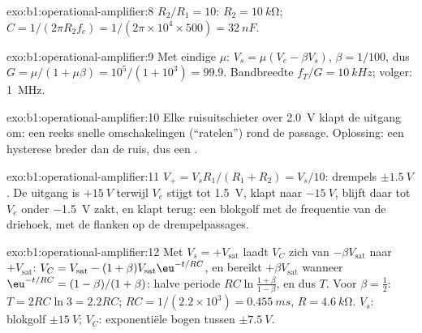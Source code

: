 \begin{solution}{exo:b1:operational-amplifier:8}
$R_2/R_1 = 10$: $R_2 = \qty{10}{k\ohm}$; $C = 1/(2\pi R_2f_c) = 1/(2\pi
\times 10^4 \times 500) = \qty{32}{nF}$.
\end{solution}

\begin{solution}{exo:b1:operational-amplifier:9}
Met eindige $\mu$: $V_s = \mu(V_e - \beta V_s)$, $\beta = 1/100$, dus
$G = \mu/(1 + \mu\beta) = 10^5/(1 + 10^3) = 99.9$. Bandbreedte $f_T/G =
\qty{10}{kHz}$; volger: \qty{1}{MHz}.
\end{solution}

\begin{solution}{exo:b1:operational-amplifier:10}
Elke ruisuitschieter over \qty{2.0}{V} klapt de uitgang om: een reeks
snelle omschakelingen (``ratelen'') rond de passage. Oplossing: een hysterese
breder dan de ruis, dus een .
\end{solution}

\begin{solution}{exo:b1:operational-amplifier:11}
$V_+ = V_sR_1/(R_1 + R_2) = V_s/10$: drempels $\pm\qty{1.5}{V}$. De
uitgang is $+\qty{15}{V}$ terwijl $V_e$ stijgt tot \qty{1.5}{V}, klapt naar
$-\qty{15}{V}$, blijft daar tot $V_e$ onder \qty{-1.5}{V} zakt, en klapt
terug: een blokgolf met de frequentie van de driehoek, met de flanken op de
drempelpassages.
\end{solution}

\begin{solution}{exo:b1:operational-amplifier:12}
Met $V_s = +V_{\mathrm{sat}}$ laadt $V_C$ zich van $-\beta V_{\mathrm{sat}}$
naar $+V_{\mathrm{sat}}$: $V_C = V_{\mathrm{sat}} - (1 + \beta)V_{\mathrm{sat}}
\eu^{-t/RC}$, en bereikt $+\beta V_{\mathrm{sat}}$ wanneer $\eu^{-t/RC} =
(1 - \beta)/(1 + \beta)$: halve periode $RC\ln\frac{1 + \beta}{1 - \beta}$,
en dus $T$. Voor $\beta = \tfrac12$: $T = 2RC\ln 3 = 2.2RC$; $RC = 1/(2.2 \times
10^3) = \qty{0.455}{ms}$, $R = \qty{4.6}{k\ohm}$. $V_s$: blokgolf
$\pm\qty{15}{V}$; $V_C$: exponentiële bogen tussen $\pm\qty{7.5}{V}$.
\end{solution}

